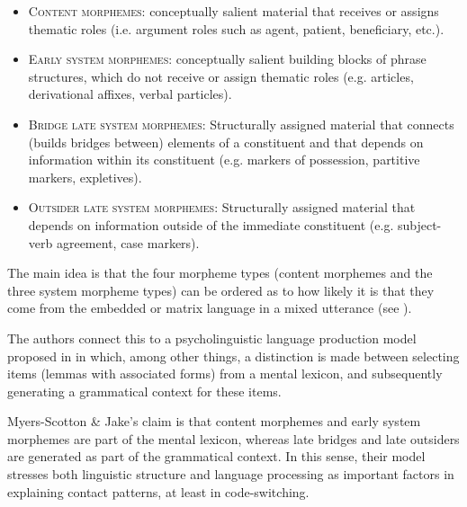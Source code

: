 \documentclass[output=paper]{langscibook}
\begin{document}
\begin{itemize}\sloppy
    \item{\textsc{Content morphemes}: conceptually salient material that receives or assigns thematic roles (i.e. argument roles such as agent, patient, beneficiary, etc.).}
    \item{\textsc{Early system morphemes}: conceptually salient building blocks of phrase structures, which do not receive or assign thematic roles (e.g. articles, derivational affixes, verbal particles).}
    \item{\textsc{Bridge late system morphemes}: Structurally assigned material that connects (builds bridges between) elements of a constituent and that depends on information within its constituent (e.g. markers of possession, partitive markers, expletives).}
    \item{\textsc{Outsider late system morphemes}: Structurally assigned material that depends on information outside of the immediate constituent (e.g. subject-verb agreement, case markers).}
\end{itemize}

The main idea is that the four morpheme types (content morphemes and the three system morpheme types) can be ordered as to how likely it is that they come from the embedded or matrix language in a mixed utterance (see ).

\begin{table}
\caption{Morpheme types and source languages\label{tab-ms-model}}  
\end{table}

The authors connect this to a psycholinguistic language production model proposed in \textcite{levelt1989speaking} in which, among other things, a distinction is made between selecting items (lemmas with associated forms) from a mental lexicon, and subsequently generating a grammatical context for these items.

Myers-Scotton \& Jake's claim is that content morphemes and early system morphemes are part of the mental lexicon, whereas late bridges and late outsiders are generated as part of the grammatical context. In this sense, their model stresses both linguistic structure and language processing as important factors in explaining contact patterns, at least in code-switching. 
\end{document}
